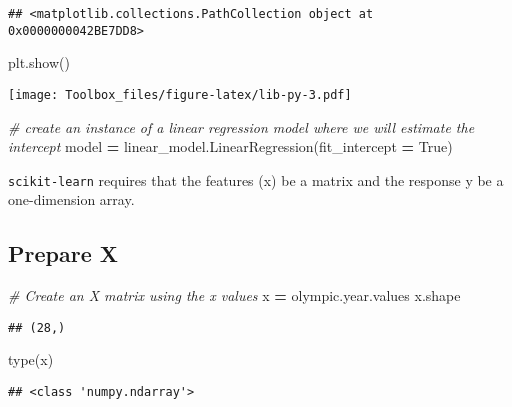 \documentclass[
]{book}
\newenvironment{Shaded}{\begin{snugshade}}{\end{snugshade}}
\newcommand{\BuiltInTok}[1]{#1}
\newcommand{\CommentTok}[1]{\textcolor[rgb]{0.56,0.35,0.01}{\textit{#1}}}
\newcommand{\NormalTok}[1]{#1}
\newcommand{\OperatorTok}[1]{\textcolor[rgb]{0.81,0.36,0.00}{\textbf{#1}}}
\newcommand{\VariableTok}[1]{\textcolor[rgb]{0.00,0.00,0.00}{#1}}
\begin{document}
\begin{verbatim}
## <matplotlib.collections.PathCollection object at 0x0000000042BE7DD8>
\end{verbatim}

\begin{Shaded}
\begin{Highlighting}[]
\NormalTok{plt.show()}
\end{Highlighting}
\end{Shaded}

\texttt{[image: Toolbox\_files/figure-latex/lib-py-3.pdf]}

\begin{Shaded}
\begin{Highlighting}[]
\CommentTok{\# create an instance of a linear regression model where we will estimate the intercept}
\NormalTok{model }\OperatorTok{=}\NormalTok{ linear\_model.LinearRegression(fit\_intercept }\OperatorTok{=} \VariableTok{True}\NormalTok{)}
\end{Highlighting}
\end{Shaded}

{\texttt{scikit-learn} requires that the features (x) be a matrix and the response y be a one-dimension array.}

\hypertarget{prepare-x}{%
\subsection{Prepare X}\label{prepare-x}}

\begin{Shaded}
\begin{Highlighting}[]
\CommentTok{\# Create an X matrix using the x values}
\NormalTok{x }\OperatorTok{=}\NormalTok{ olympic.year.values}
\NormalTok{x.shape}
\end{Highlighting}
\end{Shaded}

\begin{verbatim}
## (28,)
\end{verbatim}

\begin{Shaded}
\begin{Highlighting}[]
\BuiltInTok{type}\NormalTok{(x)}
\end{Highlighting}
\end{Shaded}

\begin{verbatim}
## <class 'numpy.ndarray'>
\end{verbatim}
\end{document}
